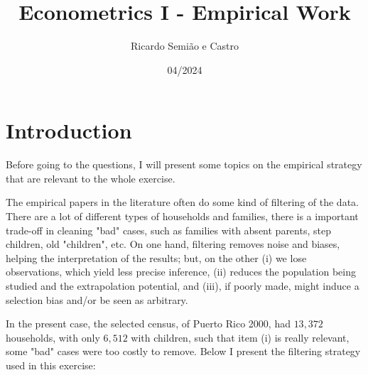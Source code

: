 \documentclass[12pt]{article}
\title{Econometrics I - Empirical Work}
\author{Ricardo Semião e Castro}
\date{04/2024}
\begin{document}
\maketitle

\section*{Introduction}

Before going to the questions, I will present some topics on the empirical strategy that are relevant to the whole exercise.

The empirical papers in the literature often do some kind of filtering of the data. There are a lot of different types of households and families, there is a important trade-off in cleaning "bad" cases, such as families with absent parents, step children, old "children", etc. On one hand, filtering removes noise and biases, helping the interpretation of the results; but, on the other (i) we lose observations, which yield less precise inference, (ii) reduces the population being studied and the extrapolation potential, and (iii), if poorly made, might induce a selection bias and/or be seen as arbitrary.

In the present case, the selected census, of Puerto Rico 2000, had $13,372$ households, with only $6,512$ with children, such that item (i) is really relevant, some "bad" cases were too costly to remove. Below I present the filtering strategy used in this exercise:
\end{document}
